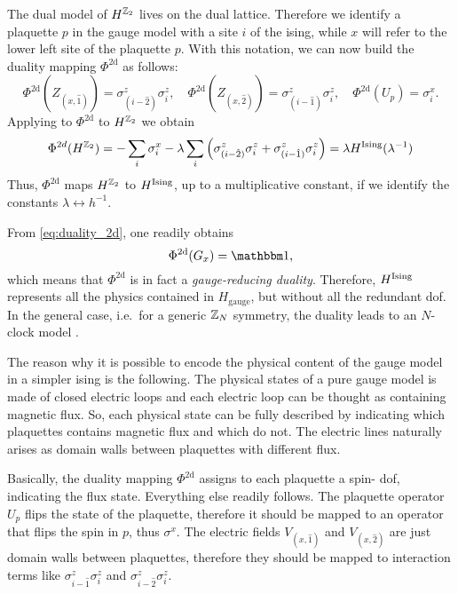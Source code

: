 The dual model of $H^{\mathbb{Z}_2}$ lives on the dual lattice.
Therefore we identify a plaquette $p$ in the gauge model with a site $i$ of the \ac{ising}, while $x$ will refer to the lower left site of the plaquette $p$.
With this notation, we can now build the duality mapping $\Phi^{\text{2d}}$ as follows:
\begin{equation}
    \Phi^{\text{2d}}(Z_{(x, \hat{1})} )  = \sigma^z_{(i-\hat{2})} \sigma^z_i, \quad
    \Phi^{\text{2d}}(Z_{(x, \hat{2})} )  = \sigma^z_{(i-\hat{1})} \sigma^z_i, \quad
    \Phi^{\text{2d}}(U_p) = \sigma^x_i.
    \label{eq:duality_2d}
\end{equation}
Applying to $\Phi^{\text{2d}}$ to $H^{\mathbb{Z}_2}$ we obtain
\begin{equation}
    \Phi^{2d} (H^{\mathbb{Z}_2}) =
    - \sum_{i} \sigma^x_i - \lambda \sum_{i} \qty(
        \sigma^z_{(i-\hat{2})} \sigma^z_i +
        \sigma^z_{(i-\hat{1})} \sigma^z_i
    ) =
    \lambda H^{\text{Ising}}(\lambda^{-1})
\end{equation}
Thus, $\Phi^{\text{2d}}$ maps $H^{\mathbb{Z}_2}$ to $H^{\text{Ising}}$, up to a multiplicative constant, if we identify the constants $\lambda \leftrightarrow h^{-1}$.

From \eqref{eq:duality_2d}, one readily obtains
\begin{equation*}
    \Phi^{\text{2d}}(G_x) = \identity,
\end{equation*}
which means that $\Phi^{\text{2d}}$ is in fact a \emph{gauge-reducing duality}.
Therefore, $H^{\text{Ising}}$ represents all the physics contained in $H_{\text{gauge}}$, but without all the redundant \ac{dof}.
In the general case, i.e.~for a generic $\mathbb{Z}_N$ symmetry, the duality leads to an $N$-clock model \cite{radicevic2019spin}.

The reason why it is possible to encode the physical content of the gauge model in a simpler \ac{ising} is the following.
The physical states of a pure gauge model is made of closed electric loops and each electric loop can be thought as containing magnetic flux.
So, each physical state can be fully described by indicating which plaquettes contains magnetic flux and which do not.
The electric lines naturally arises as domain walls between plaquettes with different flux.

Basically, the duality mapping $\Phi^{\text{2d}}$ assigns to each plaquette a spin-\onehalf{} \ac{dof}, indicating the flux state.
Everything else readily follows.
The plaquette operator $U_p$ flips the state of the plaquette, therefore it should be mapped to an operator that flips the spin in $p$, thus $\sigma^x$.
The electric fields $V_{(x, \hat{1})}$ and $V_{(x, \hat{2})}$ are just domain walls between plaquettes, therefore they should be mapped to interaction terms like $\sigma^z_{i-\hat{1}} \sigma^z_{i}$ and $\sigma^z_{i-\hat{2}} \sigma^z_i$.



